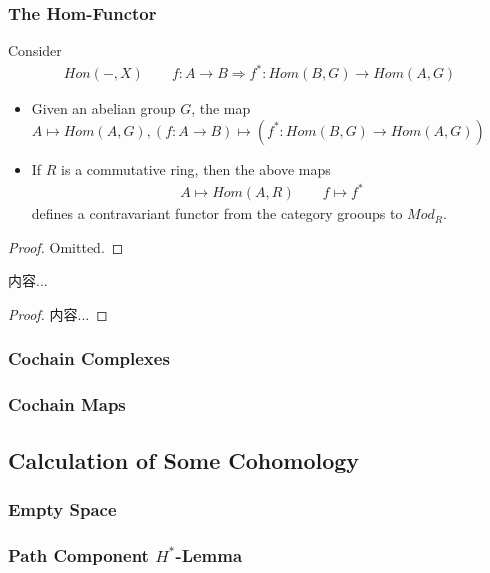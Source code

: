 \documentclass[Total.tex]{subfiles}
\begin{document}
				\subsubsection{The Hom-Functor}
					Consider
					\begin{gather*}
						Hon(-,X)\qquad f:A\rightarrow B\Rightarrow f^*:Hom(B,G)\rightarrow Hom(A,G)
					\end{gather*}
					\begin{lemma}
						\begin{itemize}
							\item Given an abelian group $G$, the map $A\mapsto Hom(A,G),(f:A\rightarrow B)\mapsto (f^*:Hom(B,G)\rightarrow Hom(A,G))$
							\item If $R$ is a commutative ring, then the above maps
							\begin{gather*}
								A\mapsto Hom(A,R)\qquad f\mapsto f^*
							\end{gather*}
							defines a contravariant functor from the category grooups to $Mod_R$.
						\end{itemize}
					\end{lemma}
					\begin{proof}
						Omitted.
					\end{proof}
					
					\begin{lemma}
						内容...
					\end{lemma}
					\begin{proof}
						内容...
					\end{proof}
				\subsubsection{Cochain Complexes}
				\subsubsection{Cochain Maps}
				
					
					
				\subsection{Calculation of Some Cohomology}
					\subsubsection{Empty Space}
					\subsubsection{Path Component $H^*$-Lemma}
\end{document}
